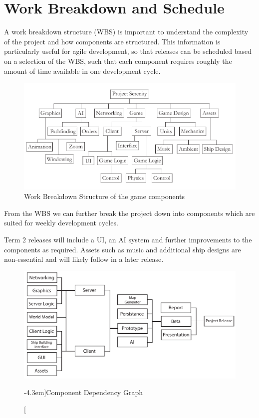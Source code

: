 \section{Work Breakdown and Schedule}
A work breakdown structure (WBS) is important to understand the complexity of the project and how components are structured. This information is particularly useful for agile development, so that releases can be scheduled based on a selection of the WBS,
 such that each component requires roughly the amount of time available in one development cycle.

\begin{figure}[h!]
	\includegraphics{res/wbs}
	\caption{Work Breakdown Structure of the game components}
\end{figure}

From the WBS we can further break the project down into components which are suited for weekly development cycles.

Term 2 releases will include a UI, an AI system and further improvements to the components as required. Assets such as music and additional ship designs are non-essential and will likely follow in a later release.

\begin{figure}
	\includegraphics{res/dependency_tree}
	\caption[][-4.3em]{Component Dependency Graph}
\end{figure}

